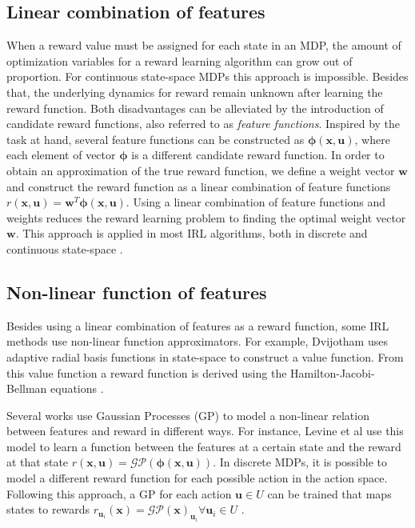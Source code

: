 \documentclass[mscThesis.tex]{subfiles}
\begin{document}
\subsection{Linear combination of features}
When a reward value must be assigned for each state in an MDP, the amount of optimization variables for a reward learning algorithm can grow out of proportion. For continuous state-space MDPs this approach is impossible. Besides that, the underlying dynamics for reward remain unknown after learning the reward function. Both disadvantages can be alleviated by the introduction of candidate reward functions, also referred to as \emph{feature functions}. Inspired by the task at hand, several feature functions can be constructed as $\bm{\phi} ( \bm{x}, \bm{u} )$, where each element of vector $\bm{\phi}$ is a different candidate reward function. In order to obtain an approximation of the true reward function, we define a weight vector $\bm{w}$ and construct the reward function as a linear combination of feature functions $r(\bm{x}, \bm{u}) = \bm{w}^T \bm{\phi} ( \bm{x}, \bm{u} )$. Using a linear combination of feature functions and weights reduces the reward learning problem to finding the optimal weight vector $\bm{w}$.  This approach is applied in most IRL algorithms, both in discrete and continuous state-space \cite{zhifei2012review}.

\subsection{Non-linear function of features}
Besides using a linear combination of features as a reward function, some IRL methods use non-linear function approximators. For example, Dvijotham uses adaptive radial basis functions in state-space to construct a value function. From this value function a reward function is derived using the Hamilton-Jacobi-Bellman equations \cite{dvijotham2010inverse}. 

Several works use Gaussian Processes (GP) to model a non-linear relation between features and reward in different ways. For instance, Levine et al \cite{Levine2011} use this model to learn a function between the features at a certain state and the reward at that state $r(\bm{x}, \bm{u}) = \mathcal{GP}(\bm{\phi}(\bm{x}, \bm{u}))$. In discrete MDPs, it is possible to model a different reward function for each possible action in the action space. Following this approach, a GP for each action $\bm{u} \in U$ can be trained that maps states to rewards $r_{\bm{u}_i}(\bm{x}) = \mathcal{GP}(\bm{x})_{\bm{u}_i} \forall \bm{u}_i \in U$ \cite{qiao2011inverse}. 
\end{document}
